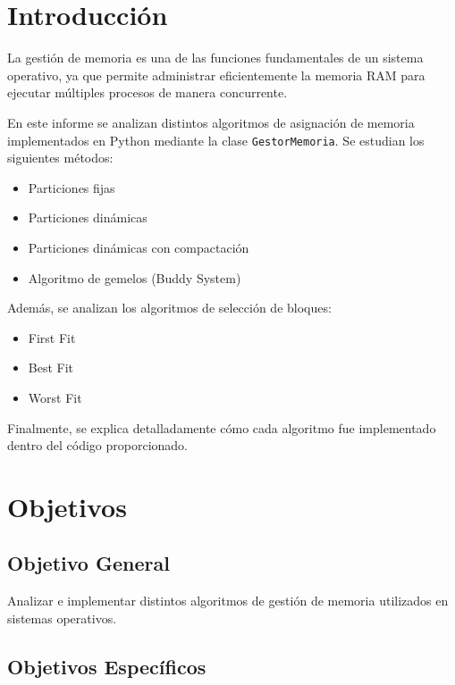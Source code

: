 \section{Introducción}

La gestión de memoria es una de las funciones fundamentales de un sistema operativo, ya que permite administrar eficientemente la memoria RAM para ejecutar múltiples procesos de manera concurrente.

En este informe se analizan distintos algoritmos de asignación de memoria implementados en Python mediante la clase \texttt{GestorMemoria}. Se estudian los siguientes métodos:

\begin{itemize}
    \item Particiones fijas
    \item Particiones dinámicas
    \item Particiones dinámicas con compactación
    \item Algoritmo de gemelos (Buddy System)
\end{itemize}

Además, se analizan los algoritmos de selección de bloques:

\begin{itemize}
    \item First Fit
    \item Best Fit
    \item Worst Fit
\end{itemize}

Finalmente, se explica detalladamente cómo cada algoritmo fue implementado dentro del código proporcionado.


\section{Objetivos}

\subsection{Objetivo General}

Analizar e implementar distintos algoritmos de gestión de memoria utilizados en sistemas operativos.

\subsection{Objetivos Específicos}

